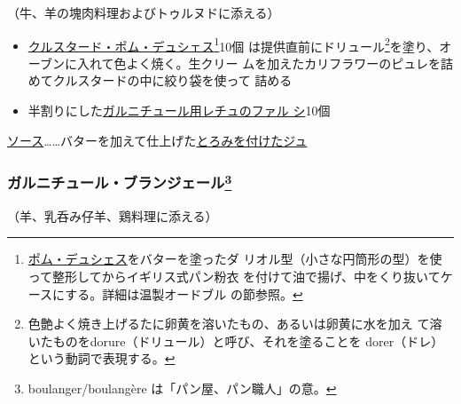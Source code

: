 \begin{recette}


（牛、羊の塊肉料理およびトゥルヌドに添える）

\begin{itemize}
\item
  \protect\hyperlink{croustade-en-pomme-duchesse}{クルスタード・ポム・デュシェス}\footnote{\protect\hyperlink{pomme-de-terre-duchesse}{ポム・デュシェス}をバターを塗ったダ
    リオル型（小さな円筒形の型）を使って整形してからイギリス式パン粉衣
    を付けて油で揚げ、中をくり抜いてケースにする。詳細は温製オードブル
    の節参照。}10個 は提供直前にドリュール\footnote{色艶よく焼き上げるたに卵黄を溶いたもの、あるいは卵黄に水を加え
    て溶いたものをdorure（ドリュール）と呼び、それを塗ることを
    dorer（ドレ）という動詞で表現する。}を塗り、オーブンに入れて色よく焼く。生クリー
  ムを加えたカリフラワーのピュレを詰めてクルスタードの中に絞り袋を使って
  詰める
\item
  半割りにした\protect\hyperlink{laitues-farcies-pour-garniture}{ガルニチュール用レチュのファル
  シ}10個
\end{itemize}

\ul{ソース}\ldots{}\ldots{}バターを加えて仕上げた\protect\hyperlink{jus-de-veau-lie}{とろみを付けたジュ}

\hypertarget{garniture-boulangere}{%
\subsubsection[ガルニチュール・ブランジェール]{\texorpdfstring{ガルニチュール・ブランジェール\footnote{boulanger/boulangère
  は「パン屋、パン職人」の意。}}{ガルニチュール・ブランジェール}}\label{garniture-boulangere}}



（羊、乳呑み仔羊、鶏料理に添える）


\end{recette}
